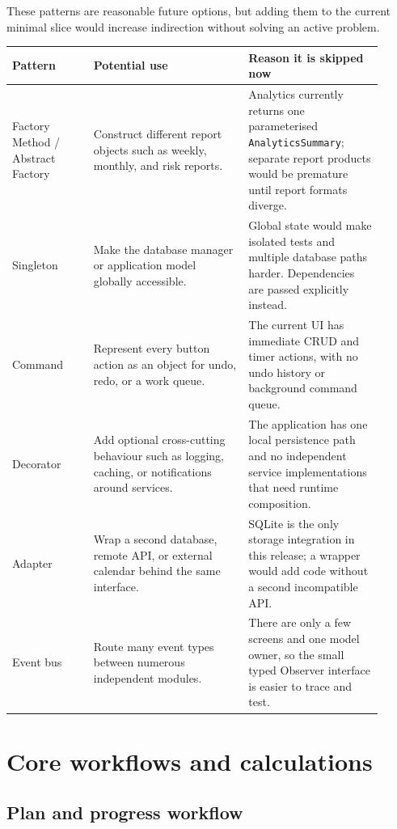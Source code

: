 \documentclass[11pt,a4paper]{article}
\newcommand{\code}[1]{\texttt{#1}}
\begin{document}
These patterns are reasonable future options, but adding them to the current minimal slice would increase indirection without solving an active problem.

\small
\begin{longtable}{@{}L{0.20\linewidth}L{0.38\linewidth}L{0.33\linewidth}@{}}
\toprule
\textbf{Pattern} & \textbf{Potential use} & \textbf{Reason it is skipped now}\\
\midrule
\endhead
Factory Method / Abstract Factory & Construct different report objects such as weekly, monthly, and risk reports. & Analytics currently returns one parameterised \code{AnalyticsSummary}; separate report products would be premature until report formats diverge.\\
Singleton & Make the database manager or application model globally accessible. & Global state would make isolated tests and multiple database paths harder. Dependencies are passed explicitly instead.\\
Command & Represent every button action as an object for undo, redo, or a work queue. & The current UI has immediate CRUD and timer actions, with no undo history or background command queue.\\
Decorator & Add optional cross-cutting behaviour such as logging, caching, or notifications around services. & The application has one local persistence path and no independent service implementations that need runtime composition.\\
Adapter & Wrap a second database, remote API, or external calendar behind the same interface. & SQLite is the only storage integration in this release; a wrapper would add code without a second incompatible API.\\
Event bus & Route many event types between numerous independent modules. & There are only a few screens and one model owner, so the small typed Observer interface is easier to trace and test.\\
\bottomrule
\end{longtable}
\normalsize

\section{Core workflows and calculations}

\subsection{Plan and progress workflow}
\end{document}

